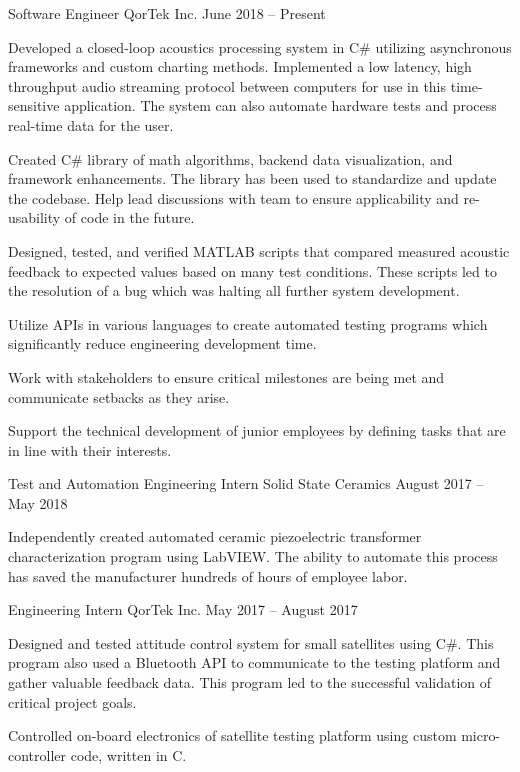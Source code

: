 \documentclass[]{awesome-cv}
\begin{document}
\vspace{-6mm}
\begin{cventries}
\linespread{1.40}
	\cventry
	{Software Engineer}
	{QorTek Inc.}
	{}
	{June 2018 – Present}
	{\begin{cvitems}
		\item {Developed a closed-loop acoustics processing system in C\# utilizing asynchronous frameworks and custom charting methods. Implemented a low latency, high throughput audio streaming protocol between computers for use in this time-sensitive application. The system can also automate hardware tests and process real-time data for the user.}
		\item {Created C\# library of math algorithms, backend data visualization, and framework enhancements. The library has been used to standardize and update the codebase. Help lead discussions with team to ensure applicability and re-usability of code in the future.}
		\item {Designed, tested, and verified MATLAB scripts that compared measured acoustic feedback to expected values based on many test conditions. These scripts led to the resolution of a bug which was halting all further system development.}
		\item {Utilize APIs in various languages to create automated testing programs which significantly reduce engineering development time.}
		\item {Work with stakeholders to ensure critical milestones are being met and communicate setbacks as they arise.}
		\item {Support the technical development of junior employees by defining tasks that are in line with their interests.}
		\end{cvitems}}
	\cventry
	{Test and Automation Engineering Intern}
	{Solid State Ceramics}
	{}
	{August 2017 – May 2018}
	{\begin{cvitems}
		\item {Independently created automated ceramic piezoelectric transformer characterization program using LabVIEW. The ability to automate this process has saved the manufacturer hundreds of hours of employee labor.}
		\end{cvitems}}
	\cventry
	{Engineering Intern}
	{QorTek Inc.}
	{}
	{May 2017 – August 2017}
	{\begin{cvitems}
		\item {Designed and tested attitude control system for small satellites using C\#. This program also used a Bluetooth API to communicate to the testing platform and gather valuable feedback data. This program led to the successful validation of critical project goals.}
		\item {Controlled on-board electronics of satellite testing platform using custom micro-controller code, written in C.}
		\end{cvitems}}
\end{cventries}
\end{document}
